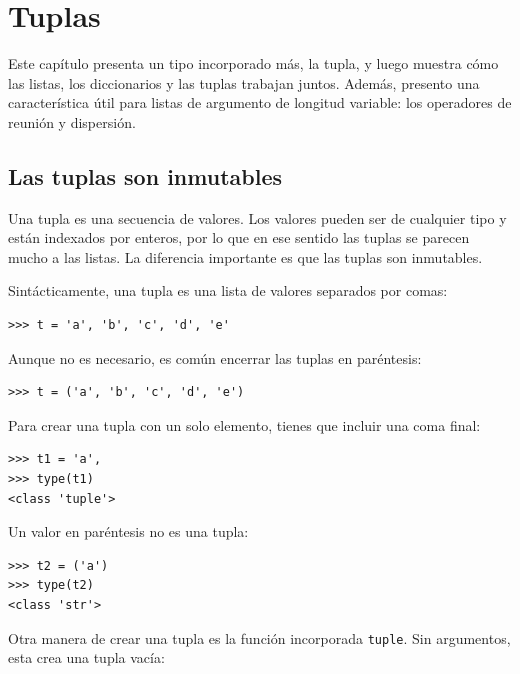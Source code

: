 \documentclass[10pt]{book}
\begin{document}
\chapter{Tuplas}
\label{tuplechap}

Este capítulo presenta un tipo incorporado más, la tupla, y luego
muestra cómo las listas, los diccionarios y las tuplas trabajan juntos.
Además, presento una característica útil para listas de argumento de longitud variable:
los operadores de reunión y dispersión.



\section{Las tuplas son inmutables}

Una tupla es una secuencia de valores.  Los valores pueden ser de cualquier tipo y 
están indexados por enteros, por lo que en ese sentido las tuplas se parecen mucho
a las listas.  La diferencia importante es que las tuplas son inmutables.

Sintácticamente, una tupla es una lista de valores separados por comas:

\begin{verbatim}
>>> t = 'a', 'b', 'c', 'd', 'e'
\end{verbatim}
%
Aunque no es necesario, es común encerrar las tuplas en
paréntesis:

\begin{verbatim}
>>> t = ('a', 'b', 'c', 'd', 'e')
\end{verbatim}
%
Para crear una tupla con un solo elemento, tienes que incluir una coma
final:

\begin{verbatim}
>>> t1 = 'a',
>>> type(t1)
<class 'tuple'>
\end{verbatim}
%
Un valor en paréntesis no es una tupla:

\begin{verbatim}
>>> t2 = ('a')
>>> type(t2)
<class 'str'>
\end{verbatim}
%
Otra manera de crear una tupla es la función incorporada {\tt tuple}.
Sin argumentos, esta crea una tupla vacía:
\end{document}
